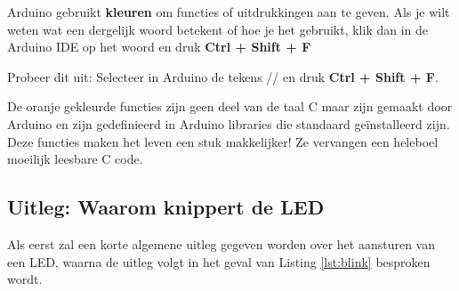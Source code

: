 \colorbox{blue!15}{
	\begin{minipage}{\textwidth}
		Arduino gebruikt \textbf{kleuren} om \textcolor{BurntOrange}{functies} of \textcolor{BlueGreen}{uitdrukkingen} aan te geven. Als je wilt weten wat een dergelijk woord betekent of hoe je het gebruikt, klik dan in de Arduino IDE op het woord en druk 
		\colorbox{mygray}{\textbf{Ctrl + Shift + F}}
		
		Probeer dit uit: Selecteer in Arduino de tekens // en druk \colorbox{mygray}{\textbf{Ctrl + Shift + F}}.

	\end{minipage}
}

De \textcolor{BurntOrange}{oranje gekleurde functies} zijn geen deel van de taal C maar zijn gemaakt door Arduino en zijn gedefinieerd in Arduino libraries die standaard geïnstalleerd zijn. Deze functies maken het leven een stuk makkelijker! Ze vervangen een heleboel moeilijk leesbare C code.

\subsection{Uitleg: Waarom knippert de LED}

Als eerst zal een korte algemene uitleg gegeven worden over het aansturen van een LED, waarna de uitleg volgt in het geval van Listing \ref{lst:blink} besproken wordt.
